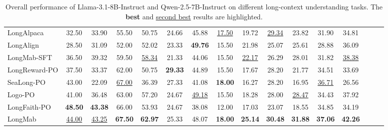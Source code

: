 \begin{table}[!t]
{\begin{tabular}{lccccccccccccccc}
    LongAlpaca & 32.50 & 33.90 & 55.50 & 50.75 & 24.66 & 45.88 & \underline{17.50} & 19.72 & \underline{29.34} & 23.82 & 31.90 & 34.81 \\
    LongAlign & 28.50 & 31.09 & 52.00 & 52.02 & 23.33 & \textbf{49.76} & 15.50 & 21.98 & 25.07 & 25.61 & 28.88 & 36.09 \\
    LongMab-SFT & 36.50 & 39.32 & 59.50 & \underline{58.34} & 21.33 & 44.06 & 15.50 & \underline{22.17} & 26.29 & 28.01 & 31.82 & \underline{38.38} \\
    LongReward-PO & 37.50 & 33.37 & 62.00 & 50.75 & \textbf{29.33} & 44.89 & 15.50 & 17.67 & 28.20 & 21.77 & 34.51 & 33.69 \\
    SeaLong-PO & 43.00 & 22.09 & \underline{67.00} & 36.39 & 27.33 & 41.08 & \textbf{18.00} & 16.27 & 28.20 & 16.95 & \underline{36.71} & 26.56 \\
    Logo-PO & 41.00 & 36.48 & 63.00 & 57.20 & 24.67 & \underline{49.18} & 15.50 & 18.28 & 28.00 & \underline{28.47} & 34.43 & 37.92 \\
    LongFaith-PO & \textbf{48.50} & \textbf{43.38} & 66.00 & 53.93 & 24.67 & 38.08 & 12.00 & 17.03 & 23.07 & 18.55 & 34.85 & 34.19 \\
    LongMab & \underline{44.00} & \underline{43.25} & \textbf{67.50} & \textbf{62.97} & 25.33 & 48.07 & \textbf{18.00} & \textbf{25.14} & \textbf{30.48} & \textbf{31.88} & \textbf{37.06} & \textbf{42.26} \\
    \hline
    \end{tabular}
}
\caption{Overall performance of Llama-3.1-8B-Instruct and Qwen-2.5-7B-Instruct on different long-context understanding tasks. The \textbf{best} and \underline{second best} results are highlighted.}
\label{tab:overall}
\end{table}
